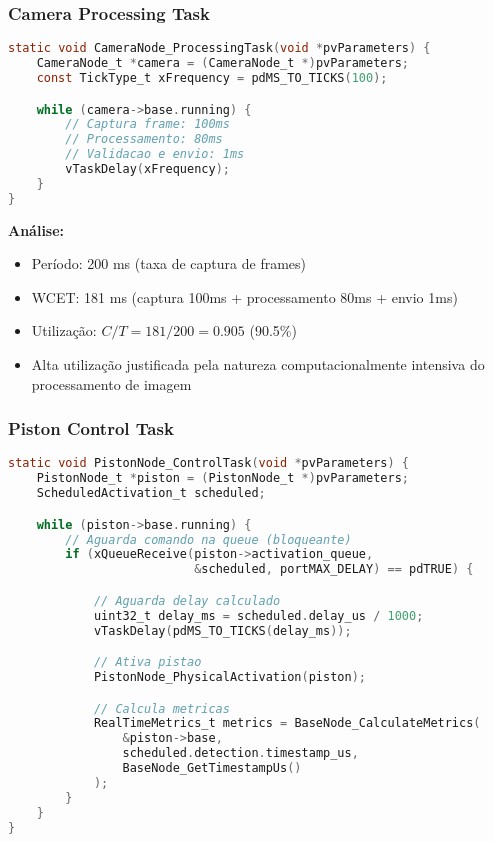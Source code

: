 \documentclass[12pt,a4paper]{article}
\begin{document}
\subsubsection{Camera Processing Task}

\begin{lstlisting}[language=C, caption={CameraNode\_ProcessingTask - Prioridade 4}]
static void CameraNode_ProcessingTask(void *pvParameters) {
    CameraNode_t *camera = (CameraNode_t *)pvParameters;
    const TickType_t xFrequency = pdMS_TO_TICKS(100);

    while (camera->base.running) {
        // Captura frame: 100ms
        // Processamento: 80ms
        // Validacao e envio: 1ms
        vTaskDelay(xFrequency);
    }
}
\end{lstlisting}

\textbf{Análise:}
\begin{itemize}
    \item Período: 200 ms (taxa de captura de frames)
    \item WCET: 181 ms (captura 100ms + processamento 80ms + envio 1ms)
    \item Utilização: $C/T = 181/200 = 0.905$ (90.5\%)
    \item Alta utilização justificada pela natureza computacionalmente intensiva do processamento de imagem
\end{itemize}

\subsubsection{Piston Control Task}

\begin{lstlisting}[language=C, caption={PistonNode\_ControlTask - Prioridade 4}]
static void PistonNode_ControlTask(void *pvParameters) {
    PistonNode_t *piston = (PistonNode_t *)pvParameters;
    ScheduledActivation_t scheduled;

    while (piston->base.running) {
        // Aguarda comando na queue (bloqueante)
        if (xQueueReceive(piston->activation_queue,
                          &scheduled, portMAX_DELAY) == pdTRUE) {

            // Aguarda delay calculado
            uint32_t delay_ms = scheduled.delay_us / 1000;
            vTaskDelay(pdMS_TO_TICKS(delay_ms));

            // Ativa pistao
            PistonNode_PhysicalActivation(piston);

            // Calcula metricas
            RealTimeMetrics_t metrics = BaseNode_CalculateMetrics(
                &piston->base,
                scheduled.detection.timestamp_us,
                BaseNode_GetTimestampUs()
            );
        }
    }
}
\end{lstlisting}
\end{document}
